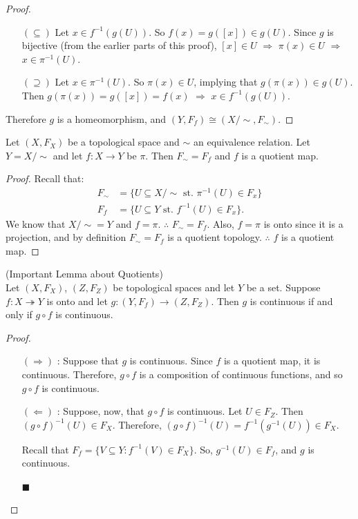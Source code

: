 \begin{proof}
\begin{itemize}
		\begin{itemize}
			\item[$(\subseteq)$] Let $x \in f^{-1}(g(U))$. So $f(x)=g([x]) \in g(U)$. Since $g$ is bijective (from the earlier parts of this proof), $[x] \in U$ $\Rightarrow$ $\pi(x) \in U$ $\Rightarrow$ $x \in \pi^{-1}(U)$.
			\item[$(\supseteq)$] Let $x \in \pi^{-1}(U)$. So $\pi(x) \in U$, implying that $g(\pi(x)) \in g(U)$. Then $g(\pi(x)) = g([x]) = f(x)$ $\Rightarrow$ $x \in f^{-1}(g(U))$.
		\end{itemize}
\end{itemize}
Therefore $g$ is a homeomorphism, and $(Y,F_f) \cong (X/\sim,F_\sim)$.
\end{proof}

\begin{theorem}
Let $(X,F_X)$ be a topological space and $\sim$ an equivalence relation. Let $Y = X/\sim$ and let $f : X \rightarrow Y$ be $\pi$. Then $F_\sim = F_f$ and $f$ is a quotient map.
\end{theorem}
\begin{proof}
Recall that:
\begin{align*}
	F_\sim &= \{ U \subseteq X/\sim \text{ st. } \pi^{-1} (U) \in F_x \} \\
	F_f		 &= \{ U \subseteq Y \text{ st. } f^{-1} (U) \in F_x \}.
\end{align*}
We know that $X/\sim = Y$ and $f = \pi$. $\therefore$ $F_\sim = F_f$. Also, $f = \pi$ is onto since it is a projection, and by definition $F_\sim = F_f$ is a quotient topology. $\therefore$ $f$ is a quotient map.
\end{proof}

\begin{lemma} (Important Lemma about Quotients)\\
Let $(X,F_X)$, $(Z,F_Z)$ be topological spaces and let $Y$ be a set. Suppose $f: X \twoheadrightarrow Y$ is onto and let $g: (Y,F_f) \rightarrow (Z,F_Z)$. Then $g$ is continuous if and only if $g \circ f$ is continuous.
\end{lemma}
\begin{proof}
\begin{itemize}
\item[$(\Rightarrow)$]: Suppose that $g$ is continuous.  Since $f$ is a quotient map, it is continuous.  Therefore, $g\circ f$ is a composition of continuous functions, and so $g\circ f$ is continuous.

\item[$(\Leftarrow)$]:  Suppose, now, that $g\circ f$ is continuous.  Let $U\in F_Z$.  Then $(g\circ f)^{-1}(U)\in F_X$.  Therefore, $(g\circ f)^{-1}(U) = f^{-1}(g^{-1}(U)) \in F_X$.
 
 Recall that $F_f = \{ V\subseteq Y : f^{-1}(V)\in F_X\}$.  So, $g^{-1}(U) \in F_f$, and $g$ is continuous.  \begin{flushright}$\blacksquare$\end{flushright}
\end{itemize}
\end{proof}


